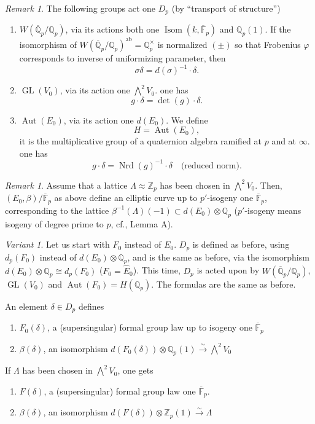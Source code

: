 \documentclass[11pt,a4paper]{article}
\theoremstyle{plain}
\theoremstyle{definition}
\theoremstyle{remark}
\newtheorem{remark}[theorem]{Remark}
\newtheorem*{variant}{Variant}
\DeclareMathOperator{\Aut}{Aut}
\DeclareMathOperator{\Isom}{Isom}
\DeclareMathOperator{\GL}{GL}
\DeclareMathOperator{\Nrd}{Nrd}
\newcommand{\Qpbar}{\overline{\mathbb{Q}}_{p}}
\newcommand{\Fpbar}{\overline{\mathbb{F}}_{p}}
\newcommand{\Zp}{\mathbb{Z}_{p}}
\newcommand{\Qp}{\mathbb{Q}_{p}}
\begin{document}
\begin{remark}
The following groups act one $D_{p}$ (by ``transport of structure'')
\begin{enumerate}[label=(\alph*)]
\item $W(\Qpbar/\Qp)$, via its actions both one $\Isom(k, \Fpbar)$ and $\Qp(1)$. If the isomorphism of $W(\Qpbar/\Qp)^{\mathrm{ab}} = \Qp^{\times}$ is normalized $(\pm)$ so that Frobenius $\varphi$ corresponds to inverse of uniformizing parameter, then
\[
\sigma\delta = d(\sigma)^{-1} \cdot \delta.
\]
\item $\GL(V_{0})$, via its action one $\bigwedge^{2} V_{0}$. one has
\[
g \cdot \delta = \det(g) \cdot \delta.
\]
\item $\Aut(E_{0})$, via its action one $d(E_{0})$. We define
\[
H = \Aut(E_{0}),
\]
it is the multiplicative group of a quaternion algebra ramified at $p$ and at $\infty$. one has
\[
g \cdot \delta = \Nrd(g)^{-1} \cdot \delta \quad \text{(reduced norm)}.
\]
\end{enumerate}
\end{remark}

\begin{remark}
Assume that a lattice $\Lambda \approx \Zp$ has been chosen in $\bigwedge^{2} V_{0}$. Then, $(E_{0}, \beta)/\Fpbar$ as above define an elliptic curve up to $p'$-isogeny one $\Fpbar$, corresponding to the lattice $\beta^{-1}(\Lambda)(-1) \subset d(E_{0}) \otimes \Qp$ ($p'$-isogeny means isogeny of degree prime to $p$, cf., Lemma A).
\end{remark}

\begin{variant}
Let us start with $F_{0}$ instead of $E_{0}$. $D_{p}$ is defined as before, using $d_{p}(F_{0})$ instead of $d(E_{0}) \otimes \Qp$, and is the same as before, via the isomorphism $d(E_{0}) \otimes \Qp \cong d_{p}(F_{0})$ ($F_{0} = \widehat{E}_{0}$). This time, $D_{p}$ is acted upon by $W(\Qpbar/\Qp)$, $\GL(V_{0})$ and $\Aut(F_{0}) = H(\Qp)$. The formulas are the same as before.

An element $\delta \in D_{p}$ defines
\begin{enumerate}[label=(\alph*)]
\item $F_{0}(\delta)$, a (supersingular) formal group law up to isogeny one $\Fpbar$
\item $\beta(\delta)$, an isomorphism $d(F_{0}(\delta)) \otimes \Qp(1) \xrightarrow{\sim} \bigwedge^{2} V_{0}$
\end{enumerate}
If $\Lambda$ has been chosen in $\bigwedge^{2} V_{0}$, one gets
\begin{enumerate}[label=(\alph*)]
\item $F(\delta)$, a (supersingular) formal group law one $\Fpbar$.
\item $\beta(\delta)$, an isomorphism $d(F(\delta)) \otimes \Zp(1) \xrightarrow{\sim} \Lambda$
\end{enumerate}
\end{variant}
\end{document}
